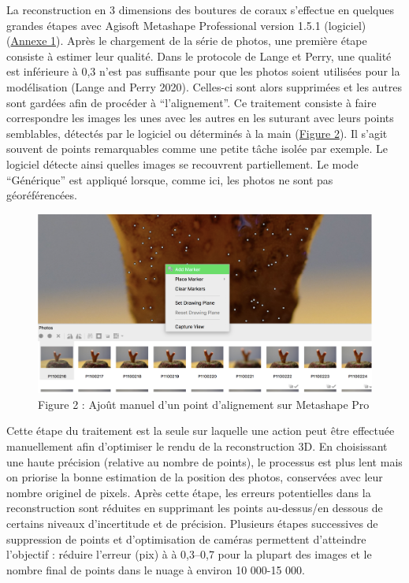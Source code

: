 \documentclass[]{article}
\begin{document}
La reconstruction en 3 dimensions des boutures de coraux s'effectue en
quelques grandes étapes avec Agisoft Metashape Professional version
1.5.1 (logiciel) (\protect\hyperlink{Annexeux5cux25201}{Annexe 1}).
Après le chargement de la série de photos, une première étape consiste à
estimer leur qualité. Dans le protocole de Lange et Perry, une qualité
est inférieure à 0,3 n'est pas suffisante pour que les photos soient
utilisées pour la modélisation (Lange and Perry 2020). Celles-ci sont
alors supprimées et les autres sont gardées afin de procéder à
``l'alignement''. Ce traitement consiste à faire correspondre les images
les unes avec les autres en les suturant avec leurs points semblables,
détectés par le logiciel ou déterminés à la main
(\protect\hyperlink{fig:Figureux5cux25202}{Figure 2}). Il s'agit souvent
de points remarquables comme une petite tâche isolée par exemple. Le
logiciel détecte ainsi quelles images se recouvrent partiellement. Le
mode ``Générique'' est appliqué lorsque, comme ici, les photos ne sont
pas géoréférencées.

\begin{figure}

{\centering \includegraphics[width=0.6\linewidth]{images/metashape} 

}

\caption{Figure 2 : Ajoût manuel d'un point d'alignement sur Metashape Pro}\label{fig:unnamed-chunk-3}
\end{figure}

Cette étape du traitement est la seule sur laquelle une action peut être
effectuée manuellement afin d'optimiser le rendu de la reconstruction
3D. En choisissant une haute précision (relative au nombre de points),
le processus est plus lent mais on priorise la bonne estimation de la
position des photos, conservées avec leur nombre originel de pixels.
Après cette étape, les erreurs potentielles dans la reconstruction sont
réduites en supprimant les points au-dessus/en dessous de certains
niveaux d'incertitude et de précision. Plusieurs étapes successives de
suppression de points et d'optimisation de caméras permettent
d'atteindre l'objectif : réduire l'erreur (pix) à à 0,3--0,7 pour la
plupart des images et le nombre final de points dans le nuage à environ
10 000-15 000.
\end{document}
